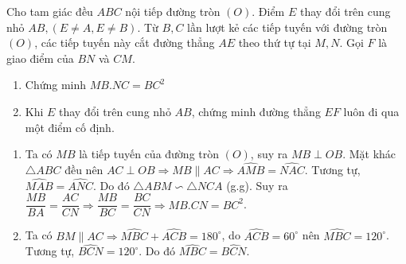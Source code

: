 \begin{ex}%
    Cho tam giác đều $ABC$ nội tiếp đường tròn $(O)$. Điểm $E$ thay đổi trên cung nhỏ $AB, (E \ne A, E \ne B)$. Từ $B, C$ lần lượt kẻ các tiếp tuyến với đường tròn $(O)$, các tiếp tuyến này cắt đường thẳng $AE$ theo thứ tự tại $M,N$. Gọi $F$ là giao điểm của $BN$ và $CM$.
    \begin{enumerate}
        \item Chứng minh $MB.NC=BC^2$
        \item Khi $E$ thay đổi trên cung nhỏ $AB$, chứng minh đường thẳng $EF$ luôn đi qua một điểm cố định.
    \end{enumerate}
\loigiai
    {
    \begin{center}
    \end{center}
    \begin{enumerate}
    \item Ta có $MB$ là tiếp tuyến của đường tròn $(O)$, suy ra $MB \perp OB$. Mặt khác $\triangle ABC$ đều nên $AC\perp OB \Rightarrow MB \parallel AC \Rightarrow \widehat{AMB}=\widehat{NAC}$. Tương tự, $\widehat{MAB}=\widehat{ANC}$. Do đó $\triangle ABM\backsim \triangle NCA$ (g.g). Suy ra $\dfrac{MB}{BA}=\dfrac{AC}{CN}\Rightarrow \dfrac{MB}{BC}=\dfrac{BC}{CN}\Rightarrow MB.CN=BC^2$.
    \item Ta có $BM \parallel AC \Rightarrow \widehat{MBC}+\widehat{ACB}=180^\circ$, do $\widehat{ACB}=60^\circ$ nên $\widehat{MBC}=120^\circ$.\\
    Tương tự, $\widehat{BCN}=120^\circ$. Do đó $\widehat{MBC}=\widehat{BCN}$.\\

\end{enumerate}}
\end{ex}
